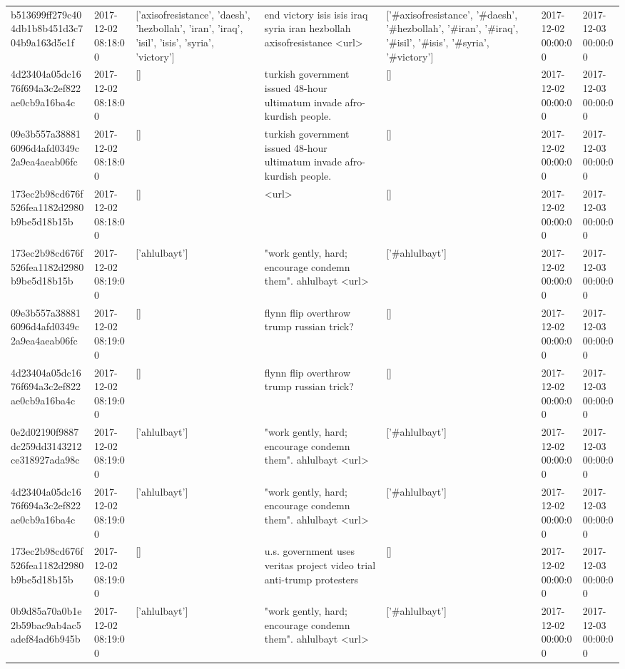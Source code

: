 \begin{tabular}{lllllll}
b513699ff279c404db1b8b451d3c704b9a163d5e1f & 2017-12-02 08:18:00 & ['axisofresistance', 'daesh', 'hezbollah', 'iran', 'iraq', 'isil', 'isis', 'syria', 'victory'] & end victory isis isis iraq syria iran hezbollah axisofresistance <url> & ['#axisofresistance', '#daesh', '#hezbollah', '#iran', '#iraq', '#isil', '#isis', '#syria', '#victory'] & 2017-12-02 00:00:00 & 2017-12-03 00:00:00 \\
4d23404a05dc1676f694a3c2ef822ae0cb9a16ba4c & 2017-12-02 08:18:00 & [] & turkish government issued 48-hour ultimatum invade afro-kurdish people. & [] & 2017-12-02 00:00:00 & 2017-12-03 00:00:00 \\
09e3b557a388816096d4afd0349c2a9ea4aeab06fc & 2017-12-02 08:18:00 & [] & turkish government issued 48-hour ultimatum invade afro-kurdish people. & [] & 2017-12-02 00:00:00 & 2017-12-03 00:00:00 \\
173ec2b98cd676f526fea1182d2980b9be5d18b15b & 2017-12-02 08:18:00 & [] & <url> & [] & 2017-12-02 00:00:00 & 2017-12-03 00:00:00 \\
173ec2b98cd676f526fea1182d2980b9be5d18b15b & 2017-12-02 08:19:00 & ['ahlulbayt'] & "work gently, hard; encourage condemn them". ahlulbayt <url> & ['#ahlulbayt'] & 2017-12-02 00:00:00 & 2017-12-03 00:00:00 \\
09e3b557a388816096d4afd0349c2a9ea4aeab06fc & 2017-12-02 08:19:00 & [] & flynn flip overthrow trump russian trick? & [] & 2017-12-02 00:00:00 & 2017-12-03 00:00:00 \\
4d23404a05dc1676f694a3c2ef822ae0cb9a16ba4c & 2017-12-02 08:19:00 & [] & flynn flip overthrow trump russian trick? & [] & 2017-12-02 00:00:00 & 2017-12-03 00:00:00 \\
0e2d02190f9887dc259dd3143212ce318927ada98c & 2017-12-02 08:19:00 & ['ahlulbayt'] & "work gently, hard; encourage condemn them". ahlulbayt <url> & ['#ahlulbayt'] & 2017-12-02 00:00:00 & 2017-12-03 00:00:00 \\
4d23404a05dc1676f694a3c2ef822ae0cb9a16ba4c & 2017-12-02 08:19:00 & ['ahlulbayt'] & "work gently, hard; encourage condemn them". ahlulbayt <url> & ['#ahlulbayt'] & 2017-12-02 00:00:00 & 2017-12-03 00:00:00 \\
173ec2b98cd676f526fea1182d2980b9be5d18b15b & 2017-12-02 08:19:00 & [] & u.s. government uses veritas project video trial anti-trump protesters & [] & 2017-12-02 00:00:00 & 2017-12-03 00:00:00 \\
0b9d85a70a0b1e2b59bac9ab4ac5adef84ad6b945b & 2017-12-02 08:19:00 & ['ahlulbayt'] & "work gently, hard; encourage condemn them". ahlulbayt <url> & ['#ahlulbayt'] & 2017-12-02 00:00:00 & 2017-12-03 00:00:00 \\

\end{tabular}
